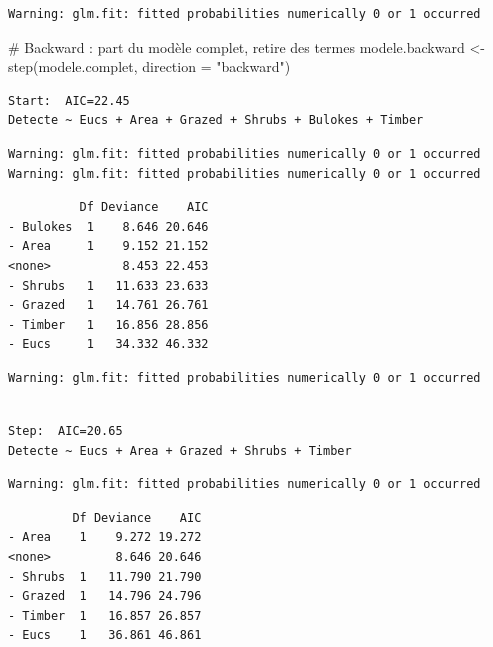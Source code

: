 \documentclass[
  french,
  letterpaper,
  DIV=11,
  numbers=noendperiod]{scrreprt}
\newenvironment{Shaded}{\begin{snugshade}}{\end{snugshade}}
\newcommand{\AttributeTok}[1]{\textcolor[rgb]{0.40,0.45,0.13}{#1}}
\newcommand{\CommentTok}[1]{\textcolor[rgb]{0.37,0.37,0.37}{#1}}
\newcommand{\FunctionTok}[1]{\textcolor[rgb]{0.28,0.35,0.67}{#1}}
\newcommand{\NormalTok}[1]{\textcolor[rgb]{0.00,0.23,0.31}{#1}}
\newcommand{\OtherTok}[1]{\textcolor[rgb]{0.00,0.23,0.31}{#1}}
\newcommand{\StringTok}[1]{\textcolor[rgb]{0.13,0.47,0.30}{#1}}
\newcounter{none} %
\begin{document}
\begin{verbatim}
Warning: glm.fit: fitted probabilities numerically 0 or 1 occurred
\end{verbatim}

\begin{Shaded}
\begin{Highlighting}[]
\CommentTok{\# Backward : part du modèle complet, retire des termes}
\NormalTok{modele.backward }\OtherTok{\textless{}{-}} \FunctionTok{step}\NormalTok{(modele.complet, }\AttributeTok{direction =} \StringTok{"backward"}\NormalTok{)}
\end{Highlighting}
\end{Shaded}

\begin{verbatim}
Start:  AIC=22.45
Detecte ~ Eucs + Area + Grazed + Shrubs + Bulokes + Timber
\end{verbatim}

\begin{verbatim}
Warning: glm.fit: fitted probabilities numerically 0 or 1 occurred
Warning: glm.fit: fitted probabilities numerically 0 or 1 occurred
\end{verbatim}

\begin{verbatim}
          Df Deviance    AIC
- Bulokes  1    8.646 20.646
- Area     1    9.152 21.152
<none>          8.453 22.453
- Shrubs   1   11.633 23.633
- Grazed   1   14.761 26.761
- Timber   1   16.856 28.856
- Eucs     1   34.332 46.332
\end{verbatim}

\begin{verbatim}
Warning: glm.fit: fitted probabilities numerically 0 or 1 occurred
\end{verbatim}

\begin{verbatim}

Step:  AIC=20.65
Detecte ~ Eucs + Area + Grazed + Shrubs + Timber
\end{verbatim}

\begin{verbatim}
Warning: glm.fit: fitted probabilities numerically 0 or 1 occurred
\end{verbatim}

\begin{verbatim}
         Df Deviance    AIC
- Area    1    9.272 19.272
<none>         8.646 20.646
- Shrubs  1   11.790 21.790
- Grazed  1   14.796 24.796
- Timber  1   16.857 26.857
- Eucs    1   36.861 46.861
\end{verbatim}
\end{document}
